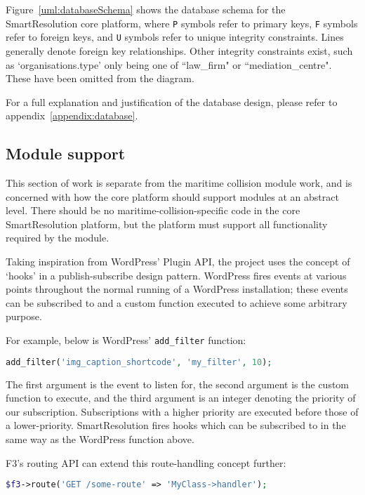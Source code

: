 Figure~\ref{uml:databaseSchema} shows the database schema for the SmartResolution core platform, where \lstinline{P} symbols refer to primary keys, \lstinline{F} symbols refer to foreign keys, and \lstinline{U} symbols refer to unique integrity constraints. Lines generally denote foreign key relationships. Other integrity constraints exist, such as `organisations.type' only being one of ``law\_firm" or ``mediation\_centre". These have been omitted from the diagram.

For a full explanation and justification of the database design, please refer to appendix~\ref{appendix:database}.

\subsection{Module support}\label{subsection:moduleSupport}

This section of work is separate from the maritime collision module work, and is concerned with how the core platform should support modules at an abstract level. There should be no maritime-collision-specific code in the core SmartResolution platform, but the platform must support all functionality required by the module.

Taking inspiration from WordPress' Plugin API, the project uses the concept of `hooks' in a publish-subscribe design pattern. WordPress fires events at various points throughout the normal running of a WordPress installation; these events can be subscribed to and a custom function executed to achieve some arbitrary purpose.

For example, below is WordPress' \lstinline{add_filter} function:

\begin{lstlisting}[language=php]
add_filter('img_caption_shortcode', 'my_filter', 10);
\end{lstlisting}

The first argument is the event to listen for, the second argument is the custom function to execute, and the third argument is an integer denoting the priority of our subscription. Subscriptions with a higher priority are executed before those of a lower-priority. SmartResolution fires hooks which can be subscribed to in the same way as the WordPress function above.

F3's routing API can extend this route-handling concept further:

\begin{lstlisting}[language=php]
$f3->route('GET /some-route' => 'MyClass->handler');
\end{lstlisting}

